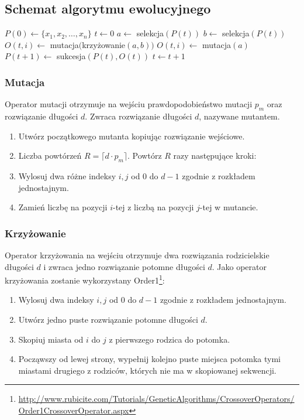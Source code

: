 \documentclass[12pt, a4paper]{article}
\begin{document}
\subsection{Schemat algorytmu ewolucyjnego}

\begin{algorithm}[!htb]
\label{ea}
\begin{algorithmic}[1]
  \State $P(0) \gets \{x_1, x_2, \ldots, x_n\}$
  \State $t \gets 0$
      \State $a \gets$ selekcja$(P(t))$
	\State $b \gets$ selekcja$(P(t))$
	\State $O(t,i) \gets$ mutacja$($krzy{\.z}owanie$(a, b))$
      \Else
	\State $O(t,i) \gets$ mutacja$(a)$
      \EndIf
    \EndFor
    \State $P(t+1) \gets$ sukcesja$(P(t),O(t))$
    \State $t \gets t+1$
  \EndWhile
\EndFunction
\end{algorithmic}
\end{algorithm}

\subsubsection{Mutacja}

Operator mutacji otrzymuje na wejściu prawdopodobieństwo mutacji $p_m$ oraz rozwiązanie długości $d$.
Zwraca rozwiązanie długości $d$, nazywane mutantem.

\begin{enumerate}
 \item Utwórz początkowego mutanta kopiując rozwiązanie wejściowe.
 \item Liczba powtórzeń $R = \lceil d \cdot  p_m \rceil$. Powtórz $R$ razy następujące kroki:
 \item Wylosuj dwa różne indeksy $i, j$ od 0 do $d-1$ zgodnie z rozkładem jednostajnym.
 \item Zamień liczbę na pozycji $i$-tej z liczbą na pozycji $j$-tej w mutancie.
\end{enumerate}

\subsubsection{Krzyżowanie}

Operator krzyżowania na wejściu otrzymuje dwa rozwiązania rodzicielskie długości $d$ i zwraca jedno rozwiązanie potomne długości $d$. 
Jako operator krzyżowania zostanie wykorzystany 
Order1\footnote{\url{http://www.rubicite.com/Tutorials/GeneticAlgorithms/CrossoverOperators/Order1CrossoverOperator.aspx}}:
\begin{enumerate}
 \item Wylosuj dwa indeksy $i, j$ od 0 do $d-1$ zgodnie z rozkładem jednostajnym.
 \item Utwórz jedno puste rozwiązanie potomne długości $d$.
 \item Skopiuj miasta od $i$ do $j$ z pierwszego rodzica do potomka.
 \item Począwszy od lewej strony, wypełnij kolejno puste miejsca potomka tymi miastami drugiego z rodziców, 
których nie ma w skopiowanej sekwencji.
\end{enumerate}
\end{document}
